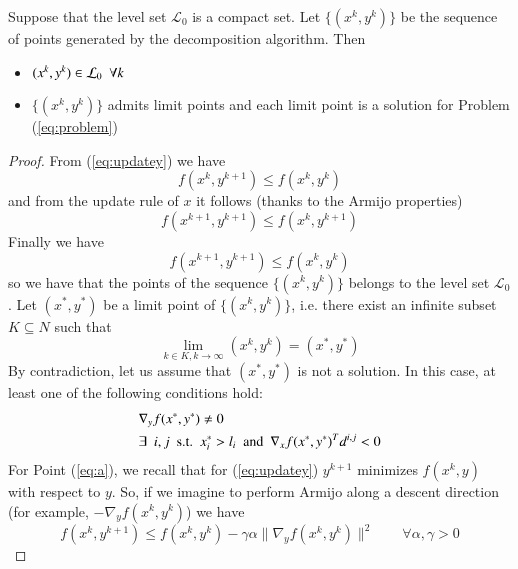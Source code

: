 \begin{proposition}
Suppose that the level set $\mathcal{L}_0$ is a compact set. Let $\{(x^k, y^k)\}$ be the sequence of points generated by the decomposition algorithm. Then
\begin{itemize}
\item $(x^k, y^k) \in \mathcal{L}_0 \enskip \forall k$ 
\item  $\{(x^k, y^k)\}$ admits limit points and each limit point is a solution for Problem (\ref{eq:problem})
\end{itemize}
\end{proposition}
\begin{proof}
From (\ref{eq:updatey}) we have
\begin{equation}
f(x^{k}, y^{k+1}) \leq f(x^{k}, y^{k})
\end{equation}
and from the update rule of $x$ it follows (thanks to the Armijo properties)
\begin{equation}\label{eq:dec}
f(x^{k+1}, y^{k+1}) \leq f(x^{k}, y^{k+1})
\end{equation}
Finally we have
\begin{equation}
f(x^{k+1}, y^{k+1}) \leq f(x^{k}, y^{k})
\end{equation}
so we have that the points of the sequence $\{(x^{k}, y^{k})\}$ belongs to the level set $\mathcal{L}_0$. Let $(x^*,y^*)$ be a limit point of $\{(x^k, y^k)\}$, i.e. there exist an infinite subset $K \subseteq N$ such that
\begin{equation}
\lim_{k \in K, k \rightarrow \infty} (x^k, y^k) = (x^*,y^*)
\end{equation}
By contradiction, let us assume that $(x^*,y^*)$ is not a solution. In this case, at least one of the following conditions hold:
\begin{subequations}
\begin{align}
&\nabla_y f(x^*,y^*) \neq 0  \label{eq:a}\\
&\exists \enskip i, j \enskip  \text{s.t.} \enskip x^*_i > l_i \enskip  \text{and} \enskip  \nabla_x f(x^*,y^*)^T d^{i,j} < 0 \label{eq:b}
\end{align}
\end{subequations}
For Point (\ref{eq:a}), we recall that for (\ref{eq:updatey}) $y^{k+1}$ minimizes $f(x^{k},y)$ with respect to $y$. So, if we imagine to perform Armijo along a descent direction (for example, $-\nabla_y f(x^{k},y^{k})$) we have
\begin{equation}\label{eq:dis}
f(x^{k}, y^{k+1}) \leq f(x^{k}, y^{k}) - \gamma \alpha \parallel \nabla_y f(x^{k}, y^{k}) \parallel ^2 \qquad \forall \alpha, \gamma > 0

\end{equation}
\end{proof}
